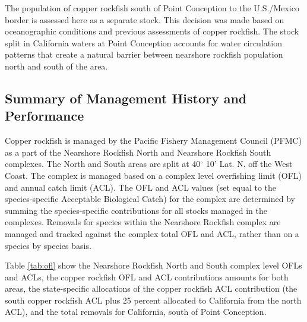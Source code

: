 \documentclass[11pt,
  english,
  a4paper,
]{article}
\begin{document}
The population of copper rockfish south of Point Conception to the U.S./Mexico border is assessed here as a separate stock. This decision was made based on oceanographic conditions and previous assessments of copper rockfish. The stock split in California waters at Point Conception accounts for water circulation patterns that create a natural barrier between nearshore rockfish population north and south of the area.

\leavevmode\tagmcend\tagstructend\par


\hypertarget{summary-of-management-history-and-performance}{%
\subsection{Summary of Management History and Performance}\label{summary-of-management-history-and-performance}}

\leavevmode\tagmcend\tagstructend


Copper rockfish is managed by the Pacific Fishery Management Council (PFMC) as a part of the Nearshore Rockfish North and Nearshore Rockfish South complexes. The North and South areas are split at 40{\(^\circ\)\leavevmode\tagmcend\tagstructend} 10' Lat. N. off the West Coast. The complex is managed based on a complex level overfishing limit (OFL) and annual catch limit (ACL). The OFL and ACL values (set equal to the species-specific Acceptable Biological Catch) for the complex are determined by summing the species-specific contributions for all stocks managed in the complexes. Removals for species within the Nearshore Rockfish complex are managed and tracked against the complex total OFL and ACL, rather than on a species by species basis.

\leavevmode\tagmcend\tagstructend\par


Table \ref{tab:ofl} show the Nearshore Rockfish North and South complex level OFLs and ACLs, the copper rockfish OFL and ACL contributions amounts for both areas, the state-specific allocations of the copper rockfish ACL contribution (the south copper rockfish ACL plus 25 percent allocated to California from the north ACL), and the total removals for California, south of Point Conception.
\end{document}

